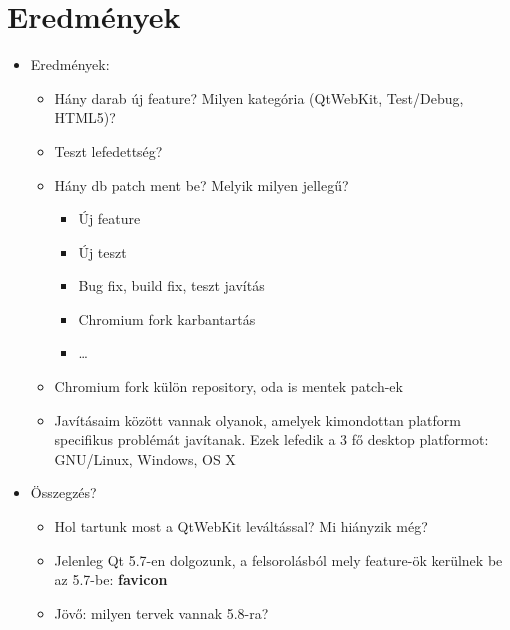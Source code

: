 \documentclass[12pt]{report}
\begin{document}
\chapter*{Eredmények}
\begin{itemize}
    \item Eredmények:
        \begin{itemize}
            \item Hány darab új feature? Milyen kategória (QtWebKit, Test/Debug, HTML5)?
            \item Teszt lefedettség?
            \item Hány db patch ment be? Melyik milyen jellegű?
                \begin{itemize}
                    \item Új feature
                    \item Új teszt
                    \item Bug fix, build fix, teszt javítás
                    \item Chromium fork karbantartás
                    \item \dots
                \end{itemize}
            \item Chromium fork külön repository, oda is mentek patch-ek
            \item Javításaim között vannak olyanok, amelyek kimondottan platform specifikus
                problémát javítanak. Ezek lefedik a 3 fő desktop platformot: GNU/Linux,
                Windows, OS X
        \end{itemize}
    \item Összegzés?
        \begin{itemize}
            \item Hol tartunk most a QtWebKit leváltással? Mi hiányzik még?
            \item Jelenleg Qt 5.7-en dolgozunk, a felsorolásból mely feature-ök kerülnek
                be az 5.7-be: \textbf{favicon}
            \item Jövő: milyen tervek vannak 5.8-ra?
        \end{itemize}
\end{itemize}


\end{document}
